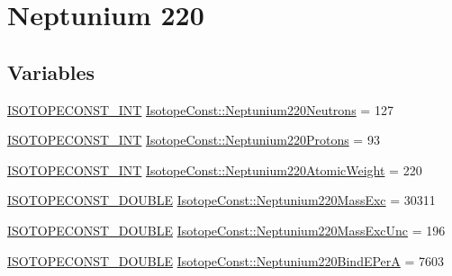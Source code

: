 \hypertarget{group___isotope_const-_neptunium-_np220}{}\section{Neptunium 220}
\label{group___isotope_const-_neptunium-_np220}
\subsection*{Variables}
\begin{DoxyCompactItemize}
\item 
\mbox{\hyperlink{group___isotope_const-_macros_ga5f18360b3e99483a35c32d789e62621c}{I\+S\+O\+T\+O\+P\+E\+C\+O\+N\+S\+T\+\_\+\+I\+NT}} \mbox{\hyperlink{group___isotope_const-_neptunium-_np220_ga5cf3ea318b9c134bf781492c4fed674b}{Isotope\+Const\+::\+Neptunium220\+Neutrons}} = 127
\item 
\mbox{\hyperlink{group___isotope_const-_macros_ga5f18360b3e99483a35c32d789e62621c}{I\+S\+O\+T\+O\+P\+E\+C\+O\+N\+S\+T\+\_\+\+I\+NT}} \mbox{\hyperlink{group___isotope_const-_neptunium-_np220_ga1b99e4c7c6ab3dc4201bfdb91946ac83}{Isotope\+Const\+::\+Neptunium220\+Protons}} = 93
\item 
\mbox{\hyperlink{group___isotope_const-_macros_ga5f18360b3e99483a35c32d789e62621c}{I\+S\+O\+T\+O\+P\+E\+C\+O\+N\+S\+T\+\_\+\+I\+NT}} \mbox{\hyperlink{group___isotope_const-_neptunium-_np220_ga993f793c91baa059310f6b3e03ff1e15}{Isotope\+Const\+::\+Neptunium220\+Atomic\+Weight}} = 220
\item 
\mbox{\hyperlink{group___isotope_const-_macros_ga8f45a7272ce02c0b4c65c44636ed719a}{I\+S\+O\+T\+O\+P\+E\+C\+O\+N\+S\+T\+\_\+\+D\+O\+U\+B\+LE}} \mbox{\hyperlink{group___isotope_const-_neptunium-_np220_ga34f5d207618de45979288824fcf8c6e3}{Isotope\+Const\+::\+Neptunium220\+Mass\+Exc}} = 30311
\item 
\mbox{\hyperlink{group___isotope_const-_macros_ga8f45a7272ce02c0b4c65c44636ed719a}{I\+S\+O\+T\+O\+P\+E\+C\+O\+N\+S\+T\+\_\+\+D\+O\+U\+B\+LE}} \mbox{\hyperlink{group___isotope_const-_neptunium-_np220_gac37f8493843442af159e5672bfa319e2}{Isotope\+Const\+::\+Neptunium220\+Mass\+Exc\+Unc}} = 196
\item 
\mbox{\hyperlink{group___isotope_const-_macros_ga8f45a7272ce02c0b4c65c44636ed719a}{I\+S\+O\+T\+O\+P\+E\+C\+O\+N\+S\+T\+\_\+\+D\+O\+U\+B\+LE}} \mbox{\hyperlink{group___isotope_const-_neptunium-_np220_gace6250ccaabfb279caac027b546d905a}{Isotope\+Const\+::\+Neptunium220\+Bind\+E\+PerA}} = 7603
\item 

\end{DoxyCompactItemize}
